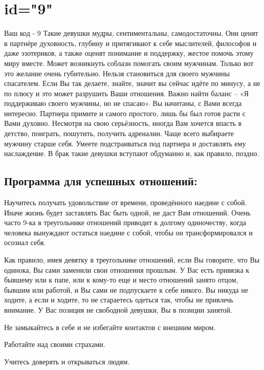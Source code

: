 \section{id="9"}{Ваш код - 9}
Такие девушки мудры, сентиментальны, самодостаточны. Они ценят в 
партнёре духовность, глубину и притягивают к себе мыслителей, 
философов и даже эзотериков, а также оценят понимание и поддержку, 
жестое помочь этому миру вместе. Может возникнуть соблазн помогать 
своим мужчинам. Только вот это желание очень губительно. Нельзя 
становиться для своего мужчины спасателем. Если Вы так делаете, 
знайте, значит вы сейчас идёте по минусу, а не по плюсу и это может 
разрушить Ваши отношения. Важно найти баланс – «Я поддерживаю своего 
мужчины, но не спасаю». Вы начитаны, с Вами всегда интересно. 
Партнера примите и самого простого, лишь бы был готов расти с Вами 
духовно. Несмотря на свою серьёзность, иногда Вам хочется впасть в 
детство, поиграть, пошутить, получить адреналин. Чаще всего выбираете 
мужчину старше себя. Умеете подстраиваться под партнера и доставлять 
ему наслаждение. В брак такие девушки вступают обдуманно и, как 
правило, поздно.
\subsection{Программа для успешных отношений:}
\item Научитесь получать удовольствие от времени, проведённого 
наедине с собой. Иначе жизнь будет заставлять Вас быть одной, не 
даст Вам отношений. Очень часто 9-ка в треугольнике отношений 
приводит к долгому одиночеству, когда человека вынуждают остаться 
наедине с собой, чтобы он трансформировался и осознал себя.
\item Как правило, имея девятку в треугольнике отношений, если Вы 
говорите, что Вы одинока, Вы сами заменили свои отношения прошлым. 
У Вас есть привязка к бывшему или к папе, или к кому-то еще и место 
отношений занято отцом, бывшим или работой, и Вы сами не подпускаете 
к себе никого. Вы никуда не ходите, а если и ходите, то не стараетесь 
одеться так, чтобы не привлечь внимание. У Вас позиция не свободной 
девушки, Вы в позиции занятой.
\item Не замыкайтесь в себе и не избегайте контактов с внешним миром.
\item Работайте над своими страхами.
\item Учитесь доверять и открываться людям.
\endsubsection
\endsection

